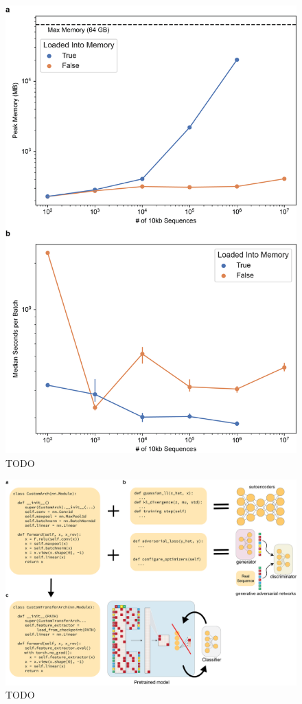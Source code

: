 \begin{figure}[p]
    \centering
    \includegraphics[width=\textwidth]{1_figures-and-files/suppfigure4.png}
    \caption[TODO]{TODO
    }
    \label{fig:supplementary_4}
\end{figure}

\begin{figure}[p]
    \centering
    \includegraphics[width=\textwidth]{1_figures-and-files/suppfigure5.png}
    \caption[TODO]{TODO
    }
    \label{fig:supplementary_5}
\end{figure}
